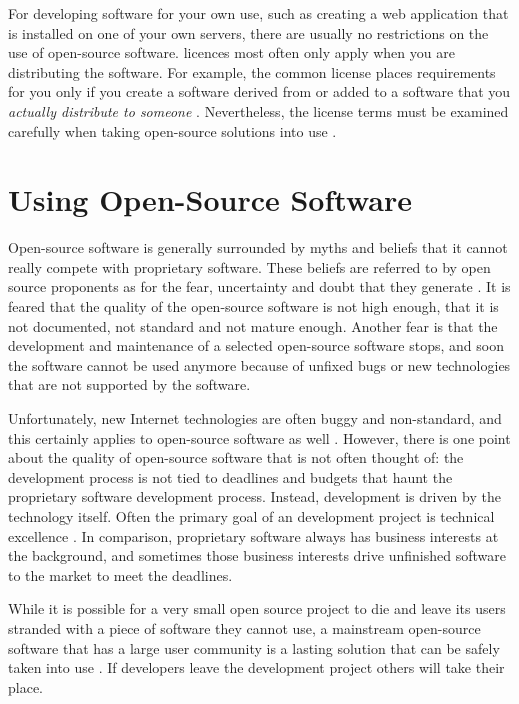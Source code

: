 For developing software for your own use, such as creating a web 
application that is installed on one of your own servers, there are 
usually no restrictions on the use of open-source software. 
 licences most often only apply when you are distributing 
the software. For example, the common  license places 
requirements for you only if you create a software derived from or 
added to a  software that you \textsl{actually distribute 
to someone} \citep{ossolutions}. Nevertheless, the license terms must 
be examined carefully when taking open-source solutions into use 
\citep{usingoss}.


\section{Using Open-Source Software}
\label{toc:oss:usage}

Open-source software is generally surrounded by myths and beliefs that 
it cannot really compete with proprietary software. These beliefs are 
referred to by open source proponents as  for the fear, 
uncertainty and doubt that they generate \citep{ossolutions}. It is 
feared that the quality of the open-source software is not high 
enough, that it is not documented, not standard and not mature enough. 
Another fear is that the development and maintenance of a selected 
open-source software stops, and soon the software cannot be used 
anymore because of unfixed bugs or new technologies that are not 
supported by the software.

Unfortunately, new Internet technologies are often buggy and 
non-standard, and this certainly applies to open-source software as 
well \citep{usingj2ee}. However, there is one point about the quality 
of open-source software that is not often thought of: the  
development process is not tied to deadlines and budgets that haunt 
the proprietary software development process. Instead,  
development is driven by the technology itself. Often the primary goal 
of an  development project is technical excellence 
\citep{ossolutions}. In comparison, proprietary software always has 
business interests at the background, and sometimes those business 
interests drive unfinished software to the market to meet the 
deadlines.

While it is possible for a very small open source project to die and 
leave its users stranded with a piece of software they cannot use, a 
mainstream open-source software that has a large user community is a 
lasting solution that can be safely taken into use \citep{usingoss}. 
If developers leave the  development project others will 
take their place.

